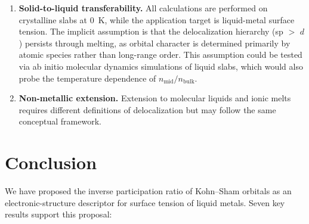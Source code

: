 \documentclass[twocolumn,showpacs,preprintnumbers,amsmath,amssymb,prb]{revtex4-2}
\begin{document}
\begin{enumerate}
  \item \textbf{Solid-to-liquid transferability.}
    All calculations are performed on crystalline slabs
    at 0~K, while the application target is liquid-metal
    surface tension.
    The implicit assumption is that the delocalization
    hierarchy (sp $>$ $d$) persists through melting,
    as orbital character is determined primarily by
    atomic species rather than long-range order.
    This assumption could be tested via ab initio molecular
    dynamics simulations of liquid slabs, which would
    also probe the temperature dependence of
    $n_\mathrm{mid}/n_\mathrm{bulk}$.

  \item \textbf{Non-metallic extension.}
    Extension to molecular liquids and ionic melts
    requires different definitions of delocalization
    but may follow the same conceptual framework.
\end{enumerate}


\section{Conclusion}
\label{sec:conclusion}

We have proposed the inverse participation ratio of
Kohn--Sham orbitals as an electronic-structure descriptor
for surface tension of liquid metals.
Seven key results support this proposal:
\end{document}
